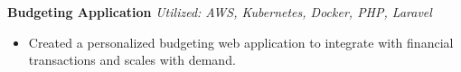 {\textbf{Budgeting Application}} {\sl Utilized: AWS, Kubernetes, Docker, PHP, Laravel} \\
\begin{itemize} \itemsep 1pt
	\item Created a personalized budgeting web application to integrate with financial transactions and scales with demand.
\end{itemize}
\vspace*{2mm}